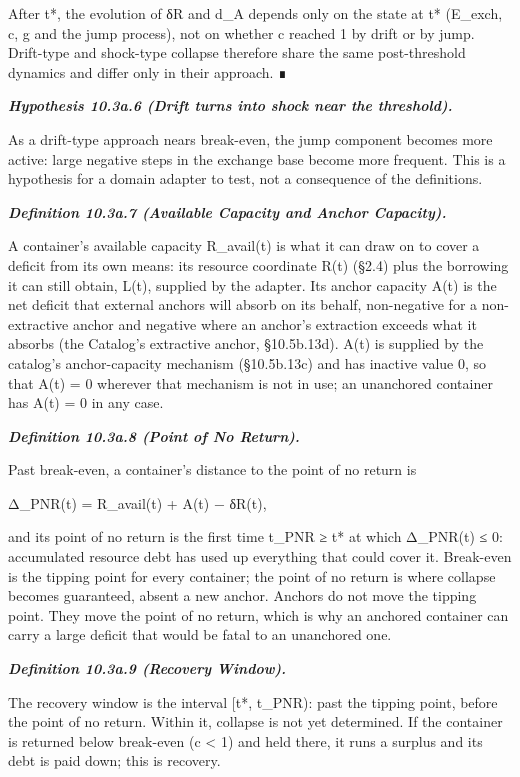 \documentclass[
]{article}
\begin{document}
After t*, the evolution of δR and d\_A depends only on the state at t*
(E\_exch, c, g and the jump process), not on whether c reached 1 by
drift or by jump. Drift-type and shock-type collapse therefore share the
same post-threshold dynamics and differ only in their approach. ∎

\emph{\textbf{Hypothesis 10.3a.6 (Drift turns into shock near the
threshold).}}

As a drift-type approach nears break-even, the jump component becomes
more active: large negative steps in the exchange base become more
frequent. This is a hypothesis for a domain adapter to test, not a
consequence of the definitions.

\emph{\textbf{Definition 10.3a.7 (Available Capacity and Anchor
Capacity).}}

A container's available capacity R\_avail(t) is what it can draw on to
cover a deficit from its own means: its resource coordinate R(t) (§2.4)
plus the borrowing it can still obtain, L(t), supplied by the adapter.
Its anchor capacity A(t) is the net deficit that external anchors will
absorb on its behalf, non-negative for a non-extractive anchor and
negative where an anchor's extraction exceeds what it absorbs (the
Catalog's extractive anchor, §10.5b.13d). A(t) is supplied by the
catalog's anchor-capacity mechanism (§10.5b.13c) and has inactive value
0, so that A(t) = 0 wherever that mechanism is not in use; an unanchored
container has A(t) = 0 in any case.

\emph{\textbf{Definition 10.3a.8 (Point of No Return).}}

Past break-even, a container's distance to the point of no return is

Δ\_PNR(t) = R\_avail(t) + A(t) − δR(t),

and its point of no return is the first time t\_PNR ≥ t* at which
Δ\_PNR(t) ≤ 0: accumulated resource debt has used up everything that
could cover it. Break-even is the tipping point for every container; the
point of no return is where collapse becomes guaranteed, absent a new
anchor. Anchors do not move the tipping point. They move the point of no
return, which is why an anchored container can carry a large deficit
that would be fatal to an unanchored one.

\emph{\textbf{Definition 10.3a.9 (Recovery Window).}}

The recovery window is the interval {[}t*, t\_PNR): past the tipping
point, before the point of no return. Within it, collapse is not yet
determined. If the container is returned below break-even (c \textless{}
1) and held there, it runs a surplus and its debt is paid down; this is
recovery.
\end{document}
